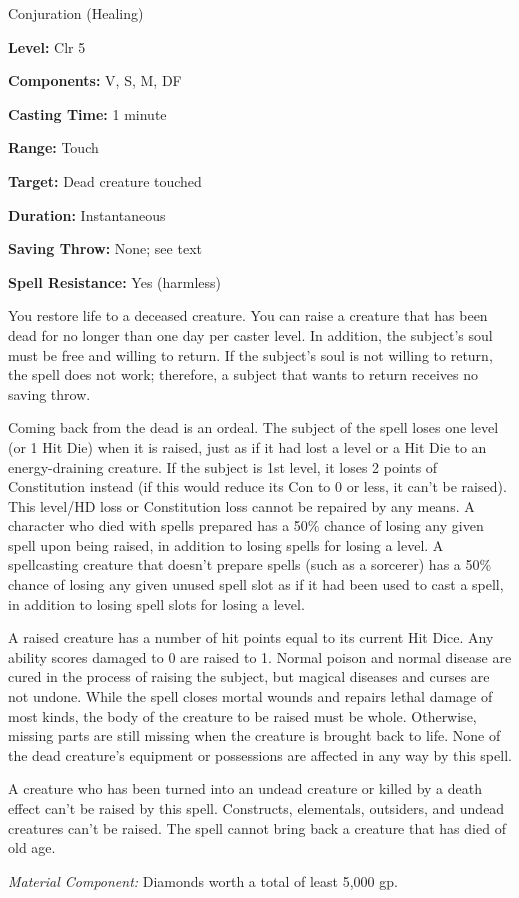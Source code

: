 
Conjuration (Healing)

\textbf{Level:} Clr 5

\textbf{Components:} V, S, M, DF

\textbf{Casting Time:} 1 minute

\textbf{Range:} Touch

\textbf{Target:} Dead creature touched

\textbf{Duration:} Instantaneous

\textbf{Saving Throw:} None; see text

\textbf{Spell Resistance:} Yes (harmless)

You restore life to a deceased creature. You can raise a creature that has been 
dead for no longer than one day per caster level. In addition, the subject's soul 
must be free and willing to return. If the subject's soul is not willing to return, 
the spell does not work; therefore, a subject that wants to return receives no 
saving throw.

Coming back from the dead is an ordeal. The subject of the spell loses one level 
(or 1 Hit Die) when it is raised, just as if it had lost a level or a Hit Die to 
an energy-draining creature. If the subject is 1st level, it loses 2 points of 
Constitution instead (if this would reduce its Con to 0 or less, it can't be raised). 
This level/HD loss or Constitution loss cannot be repaired by any means. A character 
who died with spells prepared has a 50\% chance of losing any given spell upon 
being raised, in addition to losing spells for losing a level. A spellcasting creature 
that doesn't prepare spells (such as a sorcerer) has a 50\% chance of losing any 
given unused spell slot as if it had been used to cast a spell, in addition to 
losing spell slots for losing a level.

A raised creature has a number of hit points equal to its current Hit Dice. Any 
ability scores damaged to 0 are raised to 1. Normal poison and normal disease are 
cured in the process of raising the subject, but magical diseases and curses are 
not undone. While the spell closes mortal wounds and repairs lethal damage of most 
kinds, the body of the creature to be raised must be whole. Otherwise, missing 
parts are still missing when the creature is brought back to life. None of the 
dead creature's equipment or possessions are affected in any way by this spell.

A creature who has been turned into an undead creature or killed by a death effect 
can't be raised by this spell. Constructs, elementals, outsiders, and undead creatures 
can't be raised. The spell cannot bring back a creature that has died of old age.

\textit{Material Component:} Diamonds worth a total of least 5,000 gp.

